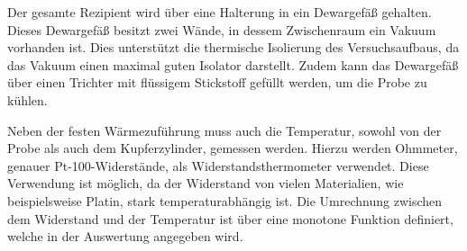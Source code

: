 Der gesamte Rezipient wird über eine Halterung in ein Dewargefäß gehalten.
Dieses Dewargefäß besitzt zwei Wände, in dessem Zwischenraum ein Vakuum vorhanden ist.
Dies unterstützt die thermische Isolierung des Versuchsaufbaus, da das Vakuum einen maximal guten Isolator darstellt. %
Zudem kann das Dewargefäß über einen Trichter mit flüssigem Stickstoff gefüllt werden, um die Probe zu kühlen.

Neben der festen Wärmezuführung muss auch die Temperatur, sowohl von der Probe als auch dem Kupferzylinder, gemessen werden.
Hierzu werden Ohmmeter, genauer Pt-100-Widerstände, als Widerstandsthermometer verwendet.
Diese Verwendung ist möglich, da der Widerstand von vielen Materialien, wie beispielsweise Platin, stark temperaturabhängig ist.
Die Umrechnung zwischen dem Widerstand und der Temperatur ist über eine monotone Funktion definiert, welche in der Auswertung angegeben wird.
